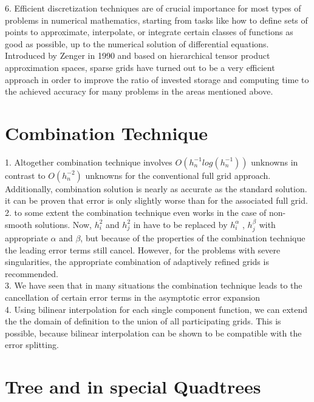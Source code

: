 6. Efficient discretization techniques are of crucial importance for most types of problems in numerical mathematics, starting from tasks like how to define sets of points to approximate, interpolate, or integrate certain classes of functions as good as possible, up to the numerical solution of differential equations. Introduced by Zenger in 1990 and based on hierarchical tensor product approximation spaces, sparse grids have turned out to be a very efficient approach in order to improve the ratio of invested storage and computing time to the achieved accuracy for many problems in the areas mentioned above.\cite{Bungartz1998}\\

\section{Combination Technique}
1. Altogether combination technique involves $O({h}^{-1}_nlog({h}^{-1}_n))$  unknowns in contrast to $O({h}^{-2}_n) $ unknowns for the conventional full grid approach. Additionally, combination solution is nearly as accurate as the standard solution. it can be proven that error is only slightly worse than for the associated full grid.\cite{Griebel1992a, Griebel1992b}\\

2. to some extent the combination technique even works in the case of non-smooth solutions. Now, ${h}^2_i$ and ${h}^2_j$ in have to be replaced by ${h}^\alpha_i$ , ${h}^\beta_j$ with appropriate $\alpha$ and $\beta$, but because of the properties of the combination technique the leading error terms still cancel. However, for the problems with severe singularities, the appropriate combination of adaptively refined grids is recommended.\cite{Griebel1992a}\\

3. We have seen that in many situations the combination technique leads to the cancellation of certain error terms in the asymptotic error expansion\cite{Griebel1992b} \\

4. Using bilinear interpolation for each single component function, we can extend the the domain of definition to the union of all participating grids. This is possible, because bilinear interpolation can be shown to be compatible with the error splitting.\cite{Rude1994} \\



\section{Tree and in special Quadtrees}



